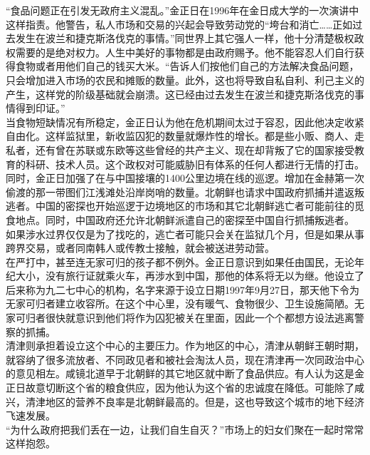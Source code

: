 “食品问题正在引发无政府主义混乱。”金正日在1996年在金日成大学的一次演讲中这样指责。他警告，私人市场和交易的兴起会导致劳动党的“垮台和消亡……正如过去发生在波兰和捷克斯洛伐克的事情。”同世界上其它强人一样，他十分清楚极权政权需要的是绝对权力。人生中美好的事物都是由政府赐予。他不能容忍人们自行获得食物或者用他们自己的钱买大米。“告诉人们按他们自己的方法解决食品问题，只会增加进入市场的农民和摊贩的数量。此外，这也将导致自私自利、利己主义的产生，这样党的阶级基础就会崩溃。这已经由过去发生在波兰和捷克斯洛伐克的事情得到印证。”\\

当食物短缺情况有所稳定，金正日认为他在危机期间太过于容忍，因此他决定收紧自由化。这样监狱里，新收监囚犯的数量就爆炸性的增长。都是些小贩、商人、走私者，还有曾在苏联或东欧等这些曾经的共产主义、现在却背叛了它的国家接受教育的科研、技术人员。这个政权对可能威胁旧有体系的任何人都进行无情的打击。\\

同时，金正日加强了在与中国接壤的1400公里边境在线的巡逻。增加在金赫第一次偷渡的那一带图们江浅滩处沿岸岗哨的数量。北朝鲜也请求中国政府抓捕并遣返叛逃者。中国的密探也开始巡逻于边境地区的市场和其它北朝鲜逃亡者可能前往的觅食地点。同时，中国政府还允许北朝鲜派遣自己的密探至中国自行抓捕叛逃者。\\

如果涉水过界仅仅是为了找吃的，逃亡者可能只会关在监狱几个月，但是如果从事跨界交易，或者同南韩人或传教士接触，就会被送进劳动营。\\

在严打中，甚至连无家可归的孩子都不例外。金正日意识到如果任由国民，无论年纪大小，没有旅行证就乘火车，再涉水到中国，那他的体系将无以为继。他设立了后来称为九二七中心的机构，名字来源于设立日期1997年9月27日，那天他下令为无家可归者建立收容所。在这个中心里，没有暖气、食物很少、卫生设施简陋。无家可归者很快就意识到他们将作为囚犯被关在里面，因此一个个都想方设法逃离警察的抓捕。\\

清津则承担着设立这个中心的主要压力。作为地区的中心，清津从朝鲜王朝时期，就容纳了很多流放者、不同政见者和被社会淘汰人员，现在清津再一次同政治中心的意见相左。咸镜北道早于北朝鲜的其它地区就中断了食品供应。有人认为这是金正日故意切断这个省的粮食供应，因为他认为这个省的忠诚度在降低。可能除了咸兴，清津地区的营养不良率是北朝鲜最高的。但是，这也导致这个城市的地下经济飞速发展。\\

“为什么政府把我们丢在一边，让我们自生自灭？”市场上的妇女们聚在一起时常常这样抱怨。\\

